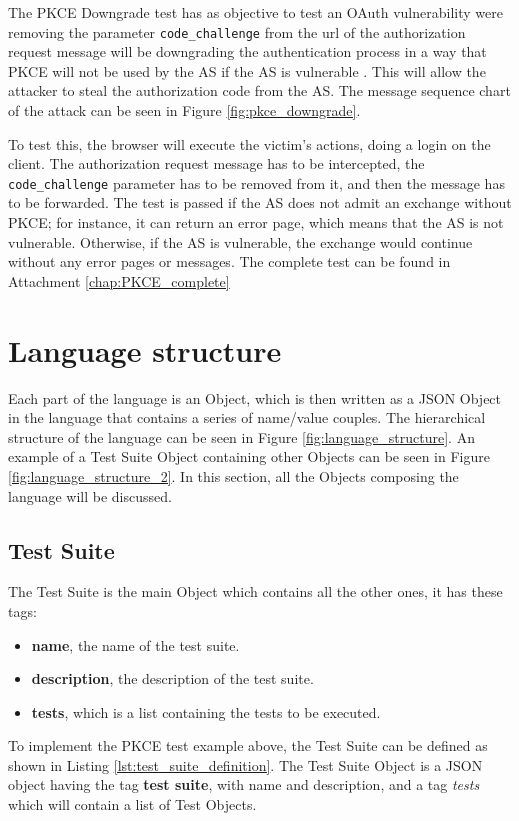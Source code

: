 The \gls{PKCE} Downgrade test has as objective to test an \gls{OAuth} vulnerability were removing the parameter \texttt{code\_challenge} from the url of the authorization request message will be downgrading the authentication process in a way that \gls{PKCE} will not be used by the AS if the AS is vulnerable \cite{pkce_downgrade}. This will allow the attacker to steal the authorization code from the AS. The message sequence chart of the attack can be seen in Figure \ref{fig:pkce_downgrade}.

To test this, the browser will execute the victim's actions, doing a login on the client. The authorization request message has to be intercepted, the \texttt{code\_challenge} parameter has to be removed from it, and then the message has to be forwarded. The test is passed if the AS does not admit an exchange without PKCE; for instance, it can return an error page, which means that the AS is not vulnerable. Otherwise, if the AS is vulnerable, the exchange would continue without any error pages or messages.
The complete test can be found in Attachment \ref{chap:PKCE_complete}


\section{Language structure}
Each part of the language is an Object, which is then written as a JSON Object in the language that contains a series of name/value couples. The hierarchical structure of the language can be seen in Figure \ref{fig:language_structure}. An example of a Test Suite Object containing other Objects can be seen in Figure \ref{fig:language_structure_2}. In this section, all the Objects composing the language will be discussed.\\

\subsection{Test Suite}
The Test Suite is the main Object which contains all the other ones, it has these tags:

\begin{itemize}
    \item \textbf{name}, the name of the test suite.
    \item \textbf{description}, the description of the test suite.
    \item \textbf{tests}, which is a list containing the tests to be executed.
\end{itemize}
To implement the \gls{PKCE} test example above, the Test Suite can be defined as shown in Listing \ref{lst:test_suite_definition}. The Test Suite Object is a JSON object having the tag \textbf{test suite}, with name and description, and a tag \textit{tests} which will contain a list of Test Objects.

